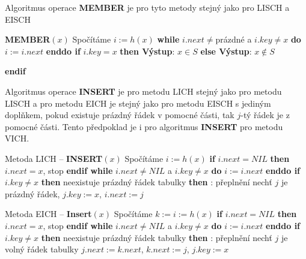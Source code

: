 \documentclass[a4paper,12pt]{article}
\begin{document}
Algoritmus operace {\bf MEMBER} je pro tyto metody 
stejný jako pro LISCH a EISCH
\bigskip

{\bf MEMBER$(x)$}\newline 
Spočítáme $i:=h(x)$\newline 
{\bf while} $i.next\ne$prázdné a $i.key\ne x$ {\bf do} $i:=i.
next$ {\bf enddo\newline 
if} $i.key=x$ {\bf then Výstup}: $x\in S$ {\bf else Výstup}: $
x\notin S$ {\bf endif

}
Algoritmus operace {\bf INSERT} je pro metodu LICH stejný 
jako pro metodu LISCH a pro metodu EICH je stejný jako 
pro metodu EISCH s jediným doplňkem, pokud existuje 
prázdný řádek v pomocné části, tak $j$-tý řádek je z 
pomocné části. Tento předpoklad je i pro algoritmus 
{\bf INSERT} pro metodu VICH.
\bigskip

Metoda LICH -- {\bf INSERT$(x)$}\newline 
Spočítáme $i:=h(x)$\newline 
{\bf if} $i.next=NIL$ {\bf then} $i.next=x$, stop {\bf endif\newline 
while} $i.next\ne NIL$ a $i.key\ne x$ {\bf do} $i:=i.next$ {\bf enddo\newline 
if} $i.key\ne x$ {\bf then}\newline 
\phantom{---}{\bf if} neexistuje prázdný řádek tabulky {\bf then}\newline 
\phantom{------}{\bf Výstup}: přeplnění\newline 
\phantom{---}{\bf else}\newline 
\phantom{------}nech\v t $j$ je prázdný řádek, $j
.key:=x$, $i.next:=j$\newline 
\phantom{---}{\bf endif\newline 
endif}
\bigskip

Metoda EICH -- {\bf Insert$(x)$}\newline 
Spočítáme $k:=i:=h(x)$\newline 
{\bf if} $i.next=NIL$ {\bf then} $i.next=x$, stop {\bf endif\newline 
while} $i.next\ne NIL$ a $i.key\ne x$ {\bf do} $i:=i.next$ {\bf enddo\newline 
if} $i.key\ne x$ {\bf then}\newline 
\phantom{---}{\bf if} neexistuje prázdný řádek tabulky {\bf then}\newline 
\phantom{------}{\bf Výstup}: přeplnění\newline 
\phantom{---}{\bf else}\newline 
\phantom{------}nech\v t $j$ je volný řádek tabulky\newline 
\phantom{------}$j.next:=k.next$, $k.next:=j$, $j.key:=x$\newline 
\phantom{---}{\bf endif\newline 
endif}
\bigskip
\end{document}
